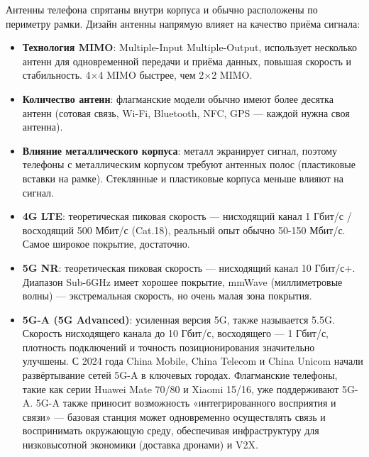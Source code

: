 
Антенны телефона спрятаны внутри корпуса и обычно расположены по периметру рамки. Дизайн антенны напрямую влияет на качество приёма сигнала:

\begin{itemize}
  \item \textbf{Технология MIMO}: Multiple-Input Multiple-Output, использует несколько антенн для одновременной передачи и приёма данных, повышая скорость и стабильность. 4×4 MIMO быстрее, чем 2×2 MIMO.
  \item \textbf{Количество антенн}: флагманские модели обычно имеют более десятка антенн (сотовая связь, Wi-Fi, Bluetooth, NFC, GPS — каждой нужна своя антенна).
  \item \textbf{Влияние металлического корпуса}: металл экранирует сигнал, поэтому телефоны с металлическим корпусом требуют антенных полос (пластиковые вставки на рамке). Стеклянные и пластиковые корпуса меньше влияют на сигнал.
\end{itemize}


\begin{itemize}
  \item \textbf{4G LTE}: теоретическая пиковая скорость — нисходящий канал 1 Гбит/с / восходящий 500 Мбит/с (Cat.18), реальный опыт обычно 50-150 Мбит/с. Самое широкое покрытие, достаточно.
  \item \textbf{5G NR}: теоретическая пиковая скорость — нисходящий канал 10 Гбит/с+. Диапазон Sub-6GHz имеет хорошее покрытие, mmWave (миллиметровые волны) — экстремальная скорость, но очень малая зона покрытия.
  \item \textbf{5G-A (5G Advanced)}: усиленная версия 5G, также называется 5.5G. Скорость нисходящего канала до 10 Гбит/с, восходящего — 1 Гбит/с, плотность подключений и точность позиционирования значительно улучшены. С 2024 года China Mobile, China Telecom и China Unicom начали развёртывание сетей 5G-A в ключевых городах. Флагманские телефоны, такие как серии Huawei Mate 70/80 и Xiaomi 15/16, уже поддерживают 5G-A. 5G-A также приносит возможность «интегрированного восприятия и связи» — базовая станция может одновременно осуществлять связь и воспринимать окружающую среду, обеспечивая инфраструктуру для низковысотной экономики (доставка дронами) и V2X.
\end{itemize}


